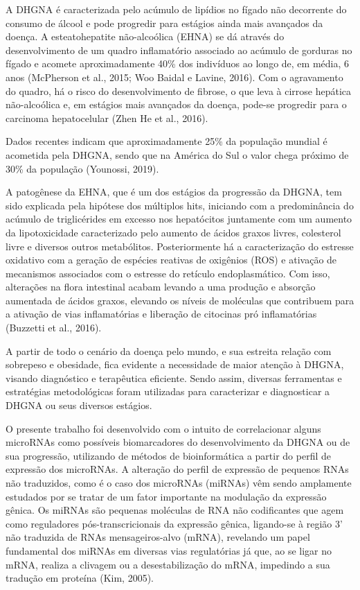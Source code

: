 \documentclass[12pt, a4paper]{article}
\begin{document}
    \par A DHGNA é caracterizada pelo acúmulo de lipídios no fígado não decorrente do consumo de álcool e pode progredir para estágios ainda mais avançados da doença. A esteatohepatite não-alcoólica (EHNA) se dá através do desenvolvimento de um quadro inflamatório associado ao acúmulo de gorduras no fígado e acomete aproximadamente 40\% dos indivíduos ao longo de, em média, 6 anos (McPherson et al., 2015; Woo Baidal e Lavine, 2016). Com o agravamento do quadro, há o risco do desenvolvimento de fibrose, o que leva à cirrose hepática não-alcoólica e, em estágios mais avançados da doença, pode-se progredir para o carcinoma hepatocelular (Zhen He et al., 2016).
    \par Dados recentes indicam que aproximadamente 25\% da população mundial é acometida pela DHGNA, sendo que na América do Sul o valor chega próximo de 30\% da população (Younossi, 2019).
    \par A patogênese da EHNA, que é um dos estágios da progressão da DHGNA, tem sido explicada pela hipótese dos múltiplos hits, iniciando com a predominância do acúmulo de triglicérides em excesso nos hepatócitos juntamente com um aumento da lipotoxicidade caracterizado pelo aumento de ácidos graxos livres, colesterol livre e diversos outros metabólitos. Posteriormente há a caracterização do estresse oxidativo com a geração de espécies reativas de oxigênios (ROS) e ativação de mecanismos associados com o estresse do retículo endoplasmático. Com isso, alterações na flora intestinal acabam levando a uma produção e absorção aumentada de ácidos graxos, elevando os níveis de moléculas que contribuem para a ativação de vias inflamatórias e liberação de citocinas pró inflamatórias (Buzzetti et al., 2016).
    \par A partir de todo o cenário da doença pelo mundo, e sua estreita relação com sobrepeso e obesidade, fica evidente a necessidade de maior atenção à DHGNA, visando diagnóstico e terapêutica eficiente. Sendo assim, diversas ferramentas e estratégias metodológicas foram utilizadas para caracterizar e diagnosticar a DHGNA ou seus diversos estágios.
    \par O presente trabalho foi desenvolvido com o intuito de correlacionar alguns microRNAs como possíveis biomarcadores do desenvolvimento da DHGNA ou de sua progressão, utilizando de métodos de bioinformática a partir do perfil de expressão dos microRNAs. A alteração do perfil de expressão de pequenos RNAs não traduzidos, como é o caso dos microRNAs (miRNAs) vêm sendo amplamente estudados por se tratar de um fator importante na modulação da expressão gênica. Os miRNAs são pequenas moléculas de RNA não codificantes que agem como reguladores pós-transcricionais da expressão gênica, ligando-se à região 3' não traduzida de RNAs mensageiros-alvo (mRNA), revelando um papel fundamental dos miRNAs em diversas vias regulatórias já que, ao se ligar no mRNA, realiza a clivagem ou a desestabilização do mRNA, impedindo a sua tradução em proteína (Kim, 2005).
\end{document}
